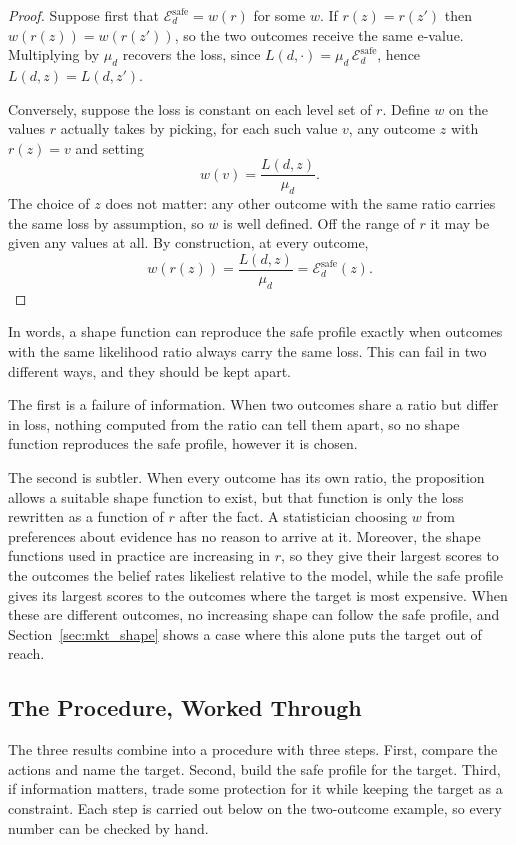 \begin{proof}
Suppose first that $\mathcal E_d^{\mathrm{safe}}=w(r)$ for some $w$. If
$r(z)=r(z')$ then $w(r(z))=w(r(z'))$, so the two outcomes receive the same
e-value. Multiplying by $\mu_d$ recovers the loss, since
$L(d,\cdot)=\mu_d\,\mathcal E_d^{\mathrm{safe}}$, hence $L(d,z)=L(d,z')$.

Conversely, suppose the loss is constant on each level set of $r$. Define $w$
on the values $r$ actually takes by picking, for each such value $v$, any
outcome $z$ with $r(z)=v$ and setting
\[
  w(v)=\frac{L(d,z)}{\mu_d}.
\]
The choice of $z$ does not matter: any other outcome with the same ratio
carries the same loss by assumption, so $w$ is well defined. Off the range of
$r$ it may be given any values at all. By construction, at every outcome,
\[
  w(r(z))=\frac{L(d,z)}{\mu_d}=\mathcal E_d^{\mathrm{safe}}(z).
\]
\end{proof}

In words, a shape function can reproduce the safe profile exactly when
outcomes with the same likelihood ratio always carry the same loss. This can
fail in two different ways, and they should be kept apart.

The first is a failure of information. When two outcomes share a ratio but
differ in loss, nothing computed from the ratio can tell them apart, so no
shape function reproduces the safe profile, however it is chosen.

The second is subtler. When every outcome has its own ratio, the proposition
allows a suitable shape function to exist, but that function is only the loss
rewritten as a function of $r$ after the fact. A statistician choosing $w$
from preferences about evidence has no reason to arrive at it. Moreover, the
shape functions used in practice are increasing in $r$, so they give their
largest scores to the outcomes the belief rates likeliest relative to the
model, while the safe profile gives its largest scores to the outcomes where
the target is most expensive. When these are different outcomes, no
increasing shape can follow the safe profile, and
Section~\ref{sec:mkt_shape} shows a case where this alone puts the target out
of reach.

\subsection{The Procedure, Worked Through}\label{sec:recipe}

The three results combine into a procedure with three steps. First, compare
the actions and name the target. Second, build the safe profile for the
target. Third, if information matters, trade some protection for it while
keeping the target as a constraint. Each step is carried out below on the
two-outcome example, so every number can be checked by hand.

